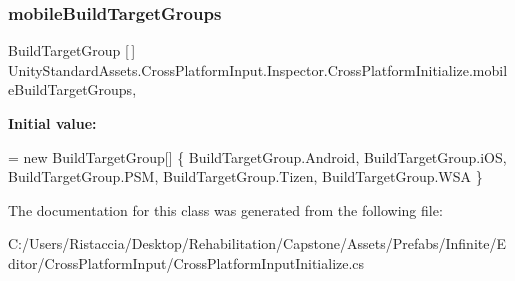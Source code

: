 \subsubsection{\texorpdfstring{mobile\+Build\+Target\+Groups}{mobileBuildTargetGroups}}
{\footnotesize\ttfamily Build\+Target\+Group \mbox{[}$\,$\mbox{]} Unity\+Standard\+Assets.\+Cross\+Platform\+Input.\+Inspector.\+Cross\+Platform\+Initialize.\+mobile\+Build\+Target\+Groups\hspace{0.3cm}{\ttfamily [static]}, {\ttfamily [private]}}

{\bfseries Initial value\+:}
\begin{DoxyCode}
= \textcolor{keyword}{new} BuildTargetGroup[]
            \{
                BuildTargetGroup.Android,
                BuildTargetGroup.iOS,
                BuildTargetGroup.PSM, 
                BuildTargetGroup.Tizen, 
                BuildTargetGroup.WSA 
            \}
\end{DoxyCode}


The documentation for this class was generated from the following file\+:\begin{DoxyCompactItemize}
\item 
C\+:/\+Users/\+Ristaccia/\+Desktop/\+Rehabilitation/\+Capstone/\+Assets/\+Prefabs/\+Infinite/\+Editor/\+Cross\+Platform\+Input/Cross\+Platform\+Input\+Initialize.\+cs\end{DoxyCompactItemize}
